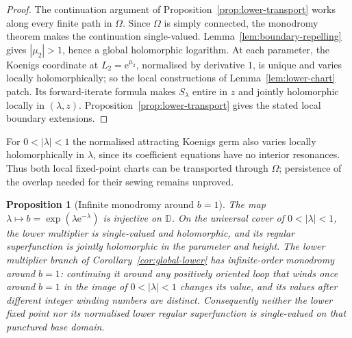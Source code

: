 \documentclass[11pt,a4paper]{article}
\newtheorem{proposition}[theorem]{Proposition}
\theoremstyle{definition}
\newcommand{\eee}{\mathrm{e}}
\begin{document}
\begin{proof}
The continuation argument of Proposition~\ref{prop:lower-transport}
works along every finite path in $\Omega$.  Since $\Omega$ is simply
connected, the monodromy theorem makes the continuation single-valued.
Lemma~\ref{lem:boundary-repelling} gives $|\mu_2|>1$, hence a global
holomorphic logarithm.  At each parameter, the Koenigs coordinate at
$L_2=\eee^{\mu_2}$, normalised by derivative $1$, is unique and varies
locally holomorphically; so the local constructions of
Lemma~\ref{lem:lower-chart} patch.  Its forward-iterate formula makes
$S_\lambda$ entire in $z$ and jointly holomorphic locally in
$(\lambda,z)$.  Proposition~\ref{prop:lower-transport} gives the stated
local boundary extensions.
\end{proof}

For $0<|\lambda|<1$ the normalised attracting Koenigs germ also varies
locally holomorphically in $\lambda$, since its coefficient equations
have no interior resonances.  Thus both local fixed-point charts can be
transported through $\Omega$; persistence of the overlap needed for
their sewing remains unproved.

\begin{proposition}[Infinite monodromy around $b=1$]
\label{prop:lower-monodromy}
The map $\lambda\mapsto b=\exp(\lambda\eee^{-\lambda})$ is injective on
$\mathbb D$.  On the universal cover of $0<|\lambda|<1$, the lower
multiplier is single-valued and holomorphic, and its regular
superfunction is jointly holomorphic in the parameter and height.
The lower multiplier branch of
Corollary~\ref{cor:global-lower} has infinite-order monodromy around
$b=1$: continuing it around any positively oriented loop that winds
once around $b=1$ in the image of $0<|\lambda|<1$ changes its value,
and its values after different integer winding numbers are distinct.
Consequently neither the lower fixed point nor its normalised lower
regular superfunction is single-valued on that punctured base domain.
\end{proposition}
\end{document}
